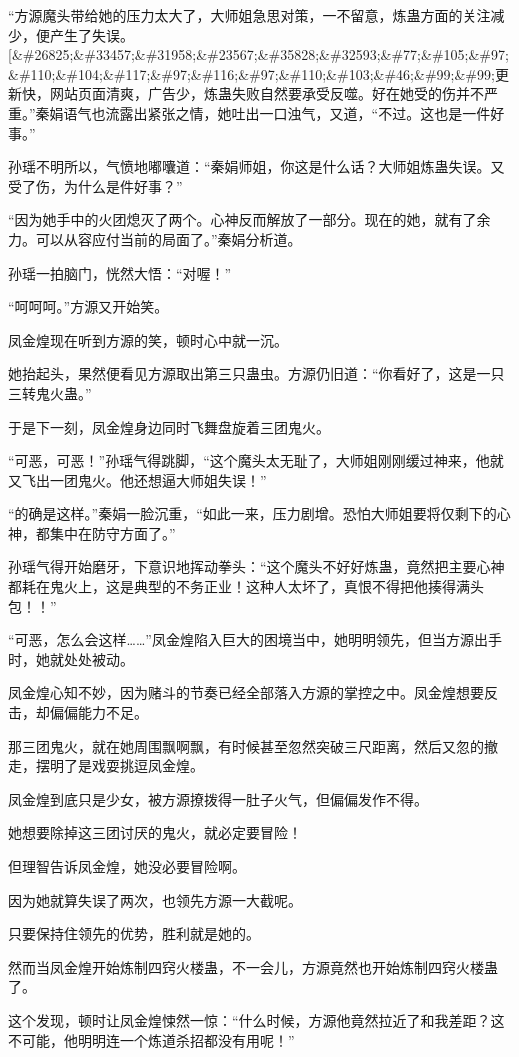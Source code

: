 \begin{this_body}
“方源魔头带给她的压力太大了，大师姐急思对策，一不留意，炼蛊方面的关注减少，便产生了失误。[\&\#26825;\&\#33457;\&\#31958;\&\#23567;\&\#35828;\&\#32593;\&\#77;\&\#105;\&\#97;\&\#110;\&\#104;\&\#117;\&\#97;\&\#116;\&\#97;\&\#110;\&\#103;\&\#46;\&\#99;\&\#99;更新快，网站页面清爽，广告少，炼蛊失败自然要承受反噬。好在她受的伤并不严重。”秦娟语气也流露出紧张之情，她吐出一口浊气，又道，“不过。这也是一件好事。”

孙瑶不明所以，气愤地嘟囔道：“秦娟师姐，你这是什么话？大师姐炼蛊失误。又受了伤，为什么是件好事？”

“因为她手中的火团熄灭了两个。心神反而解放了一部分。现在的她，就有了余力。可以从容应付当前的局面了。”秦娟分析道。

孙瑶一拍脑门，恍然大悟：“对喔！”

“呵呵呵。”方源又开始笑。

凤金煌现在听到方源的笑，顿时心中就一沉。

她抬起头，果然便看见方源取出第三只蛊虫。方源仍旧道：“你看好了，这是一只三转鬼火蛊。”

于是下一刻，凤金煌身边同时飞舞盘旋着三团鬼火。

“可恶，可恶！”孙瑶气得跳脚，“这个魔头太无耻了，大师姐刚刚缓过神来，他就又飞出一团鬼火。他还想逼大师姐失误！”

“的确是这样。”秦娟一脸沉重，“如此一来，压力剧增。恐怕大师姐要将仅剩下的心神，都集中在防守方面了。”

孙瑶气得开始磨牙，下意识地挥动拳头：“这个魔头不好好炼蛊，竟然把主要心神都耗在鬼火上，这是典型的不务正业！这种人太坏了，真恨不得把他揍得满头包！！”

“可恶，怎么会这样……”凤金煌陷入巨大的困境当中，她明明领先，但当方源出手时，她就处处被动。

凤金煌心知不妙，因为赌斗的节奏已经全部落入方源的掌控之中。凤金煌想要反击，却偏偏能力不足。

那三团鬼火，就在她周围飘啊飘，有时候甚至忽然突破三尺距离，然后又忽的撤走，摆明了是戏耍挑逗凤金煌。

凤金煌到底只是少女，被方源撩拨得一肚子火气，但偏偏发作不得。

她想要除掉这三团讨厌的鬼火，就必定要冒险！

但理智告诉凤金煌，她没必要冒险啊。

因为她就算失误了两次，也领先方源一大截呢。

只要保持住领先的优势，胜利就是她的。

然而当凤金煌开始炼制四窍火楼蛊，不一会儿，方源竟然也开始炼制四窍火楼蛊了。

这个发现，顿时让凤金煌悚然一惊：“什么时候，方源他竟然拉近了和我差距？这不可能，他明明连一个炼道杀招都没有用呢！”


\end{this_body}
